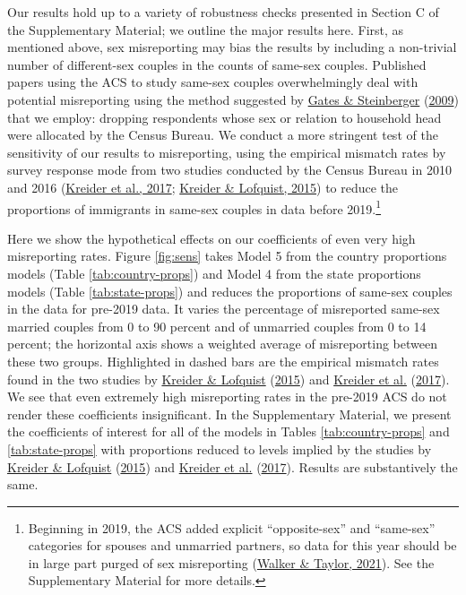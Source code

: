 \documentclass[
  12pt,
]{article}
\begin{document}
Our results hold up to a variety of robustness checks presented in Section C of the Supplementary Material; we outline the major results here. First, as mentioned above, sex misreporting may bias the results by including a non-trivial number of different-sex couples in the counts of same-sex couples. Published papers using the ACS to study same-sex couples overwhelmingly deal with potential misreporting using the method suggested by \protect\hyperlink{ref-gates_2009}{Gates \& Steinberger} (\protect\hyperlink{ref-gates_2009}{2009}) that we employ: dropping respondents whose sex or relation to household head were allocated by the Census Bureau. We conduct a more stringent test of the sensitivity of our results to misreporting, using the empirical mismatch rates by survey response mode from two studies conducted by the Census Bureau in 2010 and 2016 (\protect\hyperlink{ref-kreider_2017}{Kreider et al., 2017}; \protect\hyperlink{ref-kreider_2015}{Kreider \& Lofquist, 2015}) to reduce the proportions of immigrants in same-sex couples in data before 2019.\footnote{Beginning in 2019, the ACS added explicit ``opposite-sex'' and ``same-sex'' categories for spouses and unmarried partners, so data for this year should be in large part purged of sex misreporting (\protect\hyperlink{ref-walker_2021}{Walker \& Taylor, 2021}). See the Supplementary Material for more details.}

Here we show the hypothetical effects on our coefficients of even very high misreporting rates. Figure \ref{fig:sens} takes Model 5 from the country proportions models (Table \ref{tab:country-props}) and Model 4 from the state proportions models (Table \ref{tab:state-props}) and reduces the proportions of same-sex couples in the data for pre-2019 data. It varies the percentage of misreported same-sex married couples from 0 to 90 percent and of unmarried couples from 0 to 14 percent; the horizontal axis shows a weighted average of misreporting between these two groups. Highlighted in dashed bars are the empirical mismatch rates found in the two studies by \protect\hyperlink{ref-kreider_2015}{Kreider \& Lofquist} (\protect\hyperlink{ref-kreider_2015}{2015}) and \protect\hyperlink{ref-kreider_2017}{Kreider et al.} (\protect\hyperlink{ref-kreider_2017}{2017}). We see that even extremely high misreporting rates in the pre-2019 ACS do not render these coefficients insignificant. In the Supplementary Material, we present the coefficients of interest for all of the models in Tables \ref{tab:country-props} and \ref{tab:state-props} with proportions reduced to levels implied by the studies by \protect\hyperlink{ref-kreider_2015}{Kreider \& Lofquist} (\protect\hyperlink{ref-kreider_2015}{2015}) and \protect\hyperlink{ref-kreider_2017}{Kreider et al.} (\protect\hyperlink{ref-kreider_2017}{2017}). Results are substantively the same.
\end{document}
